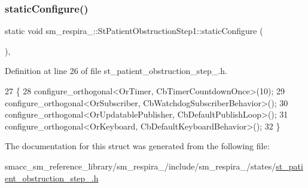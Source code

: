 \subsubsection{\texorpdfstring{static\+Configure()}{staticConfigure()}}
{\footnotesize\ttfamily static void sm\+\_\+respira\+\_\+::\+St\+Patient\+Obstruction\+Step1\+::static\+Configure (\begin{DoxyParamCaption}{ }\end{DoxyParamCaption})\hspace{0.3cm}{\ttfamily [inline]}, {\ttfamily [static]}}



Definition at line 26 of file st\+\_\+patient\+\_\+obstruction\+\_\+step\+\_.\+h.


\begin{DoxyCode}
27     \{
28         configure\_orthogonal<OrTimer, CbTimerCountdownOnce>(10);
29         configure\_orthogonal<OrSubscriber, CbWatchdogSubscriberBehavior>();
30         configure\_orthogonal<OrUpdatablePublisher, CbDefaultPublishLoop>();
31         configure\_orthogonal<OrKeyboard, CbDefaultKeyboardBehavior>();
32     \}
\end{DoxyCode}


The documentation for this struct was generated from the following file\+:\begin{DoxyCompactItemize}
\item 
smacc\+\_\+sm\+\_\+reference\+\_\+library/sm\+\_\+respira\+\_/include/sm\+\_\+respira\+\_/states/\hyperlink{st__patient__obstruction__step__1_8h}{st\+\_\+patient\+\_\+obstruction\+\_\+step\+\_.\+h}\end{DoxyCompactItemize}

